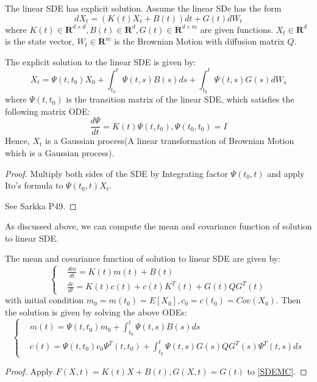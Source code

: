The linear SDE has explicit solution. Assume the linear SDe has the form 
\begin{equation}
    dX_t =\left(K(t)X_t + B(t)\right)dt + G(t)dW_t
\end{equation}
where $K(t)\in \mathbf{R}^{d\times d}, B(t)\in \mathbf{R}^{d}, G(t)\in \mathbf{R}^{d\times m}$ are given functions. 
$X_t \in \mathbf{R}^d$ is the state vector, $W_t \in \mathbf{R}^m$ is the Brownian Motion with diffusion matrix $Q$.

\begin{theorem}
    The explicit solution to the linear SDE is given by:
    \begin{equation}\label{explicitsolLSDE}
        X_t = \Psi(t, t_0)X_0 + \int_{t_0}^t \Psi(t, s)B(s)ds + \int_{t_0}^t \Psi(t, s)G(s)dW_s
    \end{equation}
    where $\Psi(t, t_0)$ is the transition matrix of the linear SDE, which satisfies the following matrix ODE:
    \begin{equation}
        \frac{d\Psi}{dt} = K(t)\Psi(t, t_0), \Psi(t_0, t_0) = I
    \end{equation}
    Hence, $X_t$ is a Gaussian process(A linear transformation of Brownian Motion which is a Gaussian process).
\end{theorem}
\begin{proof}
    Multiply both sides of the SDE by Integrating factor $\Psi(t_0, t)$ and apply Ito's formula to $\Psi(t_0, t)X_t$.

    See Sarkka P49.
\end{proof}
As discussed above, we can compute the mean and covariance function of solution to linear SDE. 
\begin{theorem}
    The mean and covariance function of solution to linear SDE are given by:
    \begin{equation}
        \left\{
            \begin{aligned}
                &\frac{d m}{d t} = K(t)m(t) + B(t)\\
                &\frac{d c}{d t} = K(t)c(t) + c(t)K^T(t)+ G(t)QG^T(t)
            \end{aligned}
        \right.
    \end{equation}
    with initial condition $m_0 =m(t_0)=E[X_0], c_0 =c(t_0)=Cov(X_0)$. Then the solution is given by solving the above ODEs:
    \begin{equation}\label{LSDEMC}
        \left\{
            \begin{aligned}
                &m(t) = \Psi(t, t_0)m_0 + \int_{t_0}^t \Psi(t, s)B(s)ds\\
                &c(t) = \Psi(t, t_0)c_0\Psi^T(t, t_0) + \int_{t_0}^t \Psi(t, s)G(s)QG^T(s)\Psi^T(t, s)ds
            \end{aligned}
        \right.
    \end{equation}

\end{theorem}
\begin{proof}
    Apply $F(X, t)=K(t)X + B(t), G(X, t)=G(t)$ to \ref{SDEMC}.
\end{proof}

